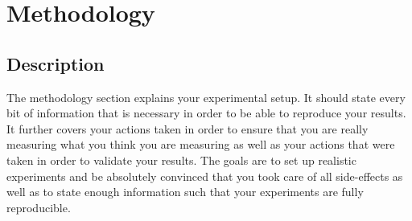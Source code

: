 \section{Methodology}
\subsection{Description}
The methodology section explains your experimental setup.
It should state every bit of information that is necessary in
order to be able to reproduce your results. It further covers
your actions taken in order to ensure that you are really
measuring what you think you are measuring as well as your
actions that were taken in order to validate your results. The
goals are to set up realistic experiments and be absolutely
convinced that you took care of all side-effects as well as to
state enough information such that your experiments are fully
reproducible.
